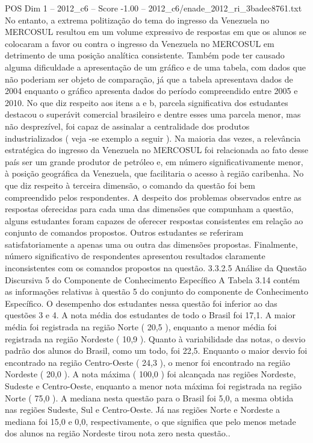 \begin{textsample}{POS Dim 1 – 2012\_c6 – Score -1.00 – 2012\_c6/enade\_2012\_ri\_3badec8761.txt}
No entanto, a extrema politização do tema do ingresso da Venezuela no MERCOSUL resultou em um volume expressivo de respostas em que os alunos se colocaram a favor ou contra o ingresso da Venezuela no MERCOSUL em detrimento de uma posição analítica consistente.
Também pode ter causado alguma dificuldade a apresentação de um gráfico e de uma tabela, com dados que não poderiam ser objeto de comparação, já que a tabela apresentava dados de 2004 enquanto o gráfico apresenta dados do período compreendido entre 2005 e 2010.
No que diz respeito aos itens a e b, parcela significativa dos estudantes destacou o superávit comercial brasileiro e dentre esses uma parcela menor, mas não desprezível, foi capaz de assinalar a centralidade dos produtos industrializados ( veja -se exemplo a seguir ).
Na maioria das vezes, a relevância estratégica do ingresso da Venezuela no MERCOSUL foi relacionada ao fato desse país ser um grande produtor de petróleo e, em número significativamente menor, à posição geográfica da Venezuela, que facilitaria o acesso à região caribenha.
No que diz respeito à terceira dimensão, o comando da questão foi bem compreendido pelos respondentes.
A despeito dos problemas observados entre as respostas oferecidas para cada uma das dimensões que compunham a questão, alguns estudantes foram capazes de oferecer respostas consistentes em relação ao conjunto de comandos propostos.
Outros estudantes se referiram satisfatoriamente a apenas uma ou outra das dimensões propostas.
Finalmente, número significativo de respondentes apresentou resultados claramente inconsistentes com os comandos propostos na questão. 3.3.2.5 Análise da Questão Discursiva 5 do Componente de Conhecimento Específico A Tabela 3.14 contém as informações relativas à questão 5 do conjunto do componente de Conhecimento Específico.
O desempenho dos estudantes nessa questão foi inferior ao das questões 3 e 4.
A nota média dos estudantes de todo o Brasil foi 17,1.
A maior média foi registrada na região Norte ( 20,5 ), enquanto a menor média foi registrada na região Nordeste ( 10,9 ).
Quanto à variabilidade das notas, o desvio padrão dos alunos do Brasil, como um todo, foi 22,5.
Enquanto o maior desvio foi encontrado na região Centro-Oeste ( 24,3 ), o menor foi encontrado na região Nordeste ( 20,0 ).
A nota máxima ( 100,0 ) foi alcançada nas regiões Nordeste, Sudeste e Centro-Oeste, enquanto a menor nota máxima foi registrada na região Norte ( 75,0 ).
A mediana nesta questão para o Brasil foi 5,0, a mesma obtida nas regiões Sudeste, Sul e Centro-Oeste.
Já nas regiões Norte e Nordeste a mediana foi 15,0 e 0,0, respectivamente, o que significa que pelo menos metade dos alunos na região Nordeste tirou nota zero nesta questão..

\end{textsample}
